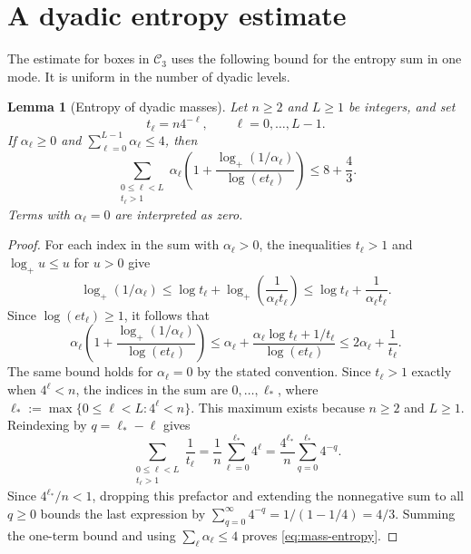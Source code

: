 \documentclass[11pt,reqno]{amsart}
\numberwithin{equation}{section}
\newtheorem{lemma}[theorem]{Lemma}
\theoremstyle{definition}
\theoremstyle{remark}
\begin{document}
\appendix
\section{A dyadic entropy estimate}\label{app:dyadic}

The estimate for boxes in $\mathcal C_3$ uses the following bound
for the entropy sum in one mode. It is uniform in the number of
dyadic levels.

\begin{lemma}[Entropy of dyadic masses]\label{lem:mass}
Let $n\ge2$ and $L\ge1$ be integers, and set
\[
 t_\ell=n4^{-\ell},\qquad \ell=0,\ldots,L-1.
\]
If $\alpha_\ell\ge0$ and $\sum_{\ell=0}^{L-1}\alpha_\ell\le4$, then
\begin{equation}\label{eq:mass-entropy}
 \sum_{\substack{0\le\ell<L\\t_\ell>1}}\alpha_\ell
 \left(1+\frac{\log_+(1/\alpha_\ell)}{\log(et_\ell)}\right)
 \le 8+\frac43.
\end{equation}
Terms with $\alpha_\ell=0$ are interpreted as zero.
\end{lemma}
\begin{proof}
For each index in the sum with $\alpha_\ell>0$, the inequalities
$t_\ell>1$ and $\log_+u\le u$ for $u>0$ give
\[
 \log_+(1/\alpha_\ell)
 \le\log t_\ell+\log_+\!\left(\frac1{\alpha_\ell t_\ell}\right)
 \le\log t_\ell+\frac1{\alpha_\ell t_\ell}.
\]
Since $\log(et_\ell)\ge1$, it follows that
\begin{equation}\label{eq:mass-one-term}
 \alpha_\ell\left(1+
       \frac{\log_+(1/\alpha_\ell)}{\log(et_\ell)}\right)
 \le\alpha_\ell+
       \frac{\alpha_\ell\log t_\ell+1/t_\ell}{\log(et_\ell)}
 \le2\alpha_\ell+\frac1{t_\ell}.
\end{equation}
The same bound holds for $\alpha_\ell=0$ by the stated convention.
Since $t_\ell>1$ exactly when $4^\ell<n$, the indices in the sum
are $0,\ldots,\ell_*$, where
$\ell_*:=\max\{0\le\ell<L:4^\ell<n\}$. This maximum exists because
$n\ge2$ and $L\ge1$. Reindexing by $q=\ell_*-\ell$ gives
\[
 \sum_{\substack{0\le\ell<L\\t_\ell>1}}\frac1{t_\ell}
 =\frac1n\sum_{\ell=0}^{\ell_*}4^\ell
 =\frac{4^{\ell_*}}n\sum_{q=0}^{\ell_*}4^{-q}.
\]
Since $4^{\ell_*}/n<1$, dropping this prefactor and extending the
nonnegative sum to all $q\ge0$ bounds the last expression by
$\sum_{q=0}^{\infty}4^{-q}=1/(1-1/4)=4/3$.
Summing the one-term bound and using $\sum_\ell\alpha_\ell\le4$
proves \eqref{eq:mass-entropy}.
\end{proof}
\end{document}

